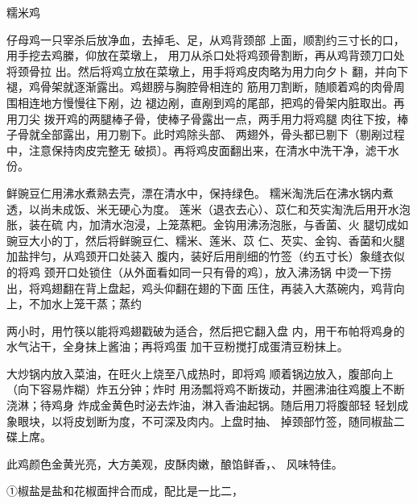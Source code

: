 \begin{recipe}[八宝糯米鸡]{糯米鸡}

\ingredients


\cooking

\step 仔母鸡一只宰杀后放净血，去掉毛、足，从鸡背颈部 上面，顺割约三寸长的口，用手挖去鸡縢，仰放在菜墩上， 用刀从杀口处将鸡颈骨割断，再从鸡背颈刀口处将颈骨拉 出。然后将鸡立放在菜墩上，用手将鸡皮肉略为用力向夕卜 翻，并向下褪，鸡骨架就逐渐露出。鸡翅膀与胸腔骨相连的 筋用刀割断，随顺着鸡的肉骨周围相连地方慢慢往下剐，边 褪边剐，直剐到鸡的尾部，把鸡的骨架内脏取出。再用刀尖 拨开鸡的两腿棒子骨，使棒子骨露出一点，两手用力将鸡腿 肉往下按，棒子骨就全部露出，用刀剔下。此时鸡除头部、 两翅外，骨头都已剔下（剔剐过程中，注意保持肉皮完整无 破损〕。再将鸡皮面翻出来，在清水中洗干净，滤干水份。

\step 鲜豌豆仁用沸水煮熟去壳，漂在清水中，保持绿色。 糯米淘洗后在沸水锅内煮透，以尚未成饭、米无硬心为度。 莲米（退衣去心）、苡仁和芡实淘洗后用开水泡胀，装在硫 内，加清水泡浸，上笼蒸粑。金钩用沸汤泡胀，与香菌、火 腿切成如豌豆大小的丁，然后将鲜豌豆仁、糯米、莲米、苡 仁、芡实、金钩、香菌和火腿加盐拌匀，从鸡颈开口处装入 腹内，装好后用削细的竹签（约五寸长）象缝衣似的将鸡 颈开口处锁住（从外面看如同一只有骨的鸡〕，放入沸汤锅 中烫一下捞出，将鸡翅翻在背上盘起，鸡头仰翻在翅的下面 压住，再装入大蒸碗内，鸡背向上，不加水上笼干蒸；蒸约

两小时，用竹筷以能将鸡翅戳破为适合，然后把它翻入盘 内，用干布帕将鸡身的水气沾干，全身抹上酱油；再将鸡蛋 加干豆粉搅打成蛋清豆粉抹上。

\step 大炒锅内放入菜油，在旺火上烧至八成热时，即将鸡 顺着锅边放入，腹部向上（向下容易炸糊）炸五分钟；炸时 用汤瓢将鸡不断拨动，并圈沸油往鸡腹上不断浇淋；待鸡身 炸成金黄色时泌去炸油，淋入香油起锅。随后用刀将腹部轻 轻划成象眼块，以将皮划断为度，不可深及肉内。上盘时抽、 掉颈部竹签，随同椒盐二碟上席。

\notes

此鸡颜色金黄光亮，大方美观，皮酥肉嫩，酿馅鲜香，、 风味特佳。

①椒盐是盐和花椒面拌合而成，配比是一比二，

\end{recipe}

